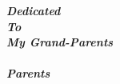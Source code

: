 \begin{center}
\vspace*{7.5cm}
\textbf{
  \textit{
    \Large{
      Dedicated \\
	To \\
	My Grand-Parents \\
	\nd \\
	Parents }}}

\end{center}

